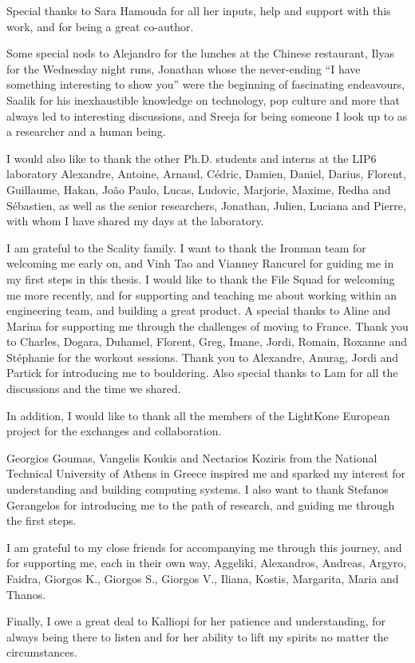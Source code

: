 Special thanks to Sara Hamouda for all her inputs, help and support with this work, and for being a great co-author.

Some special nods to
Alejandro for the lunches at the Chinese restaurant,
Ilyas for the Wednesday night runs,
Jonathan whose the never-ending ``I have something interesting to show you'' were the beginning of fascinating endeavours,
Saalik for his inexhaustible knowledge on technology, pop culture and more that always led to interesting discussions,
and Sreeja for being someone I look up to as a researcher and a human being.

I would also like to thank the other Ph.D. students and interns at the LIP6 laboratory
Alexandre, Antoine, Arnaud, C\'edric, Damien, Daniel, Darius, Florent, Guillaume, Hakan, Jo\~ao Paulo, Lucas, Ludovic, Marjorie, Maxime, Redha and S\'ebastien,
as well as the senior researchers, Jonathan, Julien, Luciana and Pierre, with whom I have shared my days at the laboratory.

I am grateful to the Scality family. I want to thank the Ironman team for welcoming me early on, and Vinh Tao and
Vianney Rancurel for guiding me in my first steps in this thesis.
I would like to thank the File Squad for welcoming me more recently, and for supporting and teaching me about working within
an engineering team, and building a great product.
A special thanks to Aline and Marina for supporting me through the challenges of moving to France.
Thank you to Charles, Dogara, Duhamel, Florent, Greg, Imane, Jordi, Romain, Roxanne and St\'ephanie for the workout
sessions.
Thank you to Alexandre, Anurag, Jordi and Partick for introducing me to bouldering.
Also special thanks to Lam for all the discussions and the time we shared.

In addition, I would like to thank all the members of the LightKone European project for the exchanges and collaboration.

\bigskip
Georgios Goumas, Vangelis Koukis and Nectarios Koziris from the National Technical University of Athens in Greece inspired
me and sparked my interest for understanding and building computing systems.
I also want to thank Stefanos Gerangelos for introducing me to the path of research, and guiding me through the first steps.

\bigskip
I am grateful to my close friends for accompanying me through this journey, and for supporting me,
each in their own way,
Aggeliki, Alexandros, Andreas, Argyro, Faidra, Giorgos K., Giorgos S., Giorgos V., Iliana, Kostis, Margarita, Maria and Thanos.

Finally, I owe a great deal to Kalliopi for her patience and understanding, for always being there to listen and for
her ability to lift my spirits no matter the circumstances.
